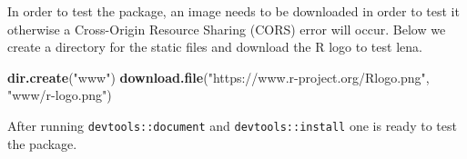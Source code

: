 \documentclass[
]{krantz}
\makeatletter
\newenvironment{Shaded}{\begin{snugshade}}{\end{snugshade}}
\newcommand{\CommentTok}[1]{\textcolor[rgb]{0.37,0.37,0.37}{\textit{#1}}}
\newcommand{\ControlFlowTok}[1]{\textcolor[rgb]{0.27,0.27,0.27}{\textbf{#1}}}
\newcommand{\DataTypeTok}[1]{\textcolor[rgb]{0.27,0.27,0.27}{#1}}
\newcommand{\KeywordTok}[1]{\textcolor[rgb]{0.27,0.27,0.27}{\textbf{#1}}}
\newcommand{\NormalTok}[1]{#1}
\newcommand{\OperatorTok}[1]{\textcolor[rgb]{0.43,0.43,0.43}{\textbf{#1}}}
\newcommand{\StringTok}[1]{\textcolor[rgb]{0.5,0.5,0.5}{#1}}
\newenvironment{kframe}{%
\medskip{}
\setlength{\fboxsep}{.8em}
 \def\at@end@of@kframe{}%
 \ifinner\ifhmode%
  \def\at@end@of@kframe{\end{minipage}}%
  \begin{minipage}{\columnwidth}%
 \fi\fi%
 \def\FrameCommand##1{\hskip\@totalleftmargin \hskip-\fboxsep
 \colorbox{shadecolor}{##1}\hskip-\fboxsep
     \hskip-\linewidth \hskip-\@totalleftmargin \hskip\columnwidth}%
 \MakeFramed {\advance\hsize-\width
   \@totalleftmargin\z@ \linewidth\hsize
   \@setminipage}}%
 {\par\unskip\endMakeFramed%
 \at@end@of@kframe}
\renewenvironment{Shaded}{\begin{kframe}}{\end{kframe}}
\makeatother
\begin{document}
In order to test the package, an image needs to be downloaded in order to test it otherwise a Cross-Origin Resource Sharing (CORS) error will occur. Below we create a directory for the static files and download the R logo to test lena.

\begin{Shaded}
\begin{Highlighting}[]
\KeywordTok{dir.create}\NormalTok{(}\StringTok{"www"}\NormalTok{)}
\KeywordTok{download.file}\NormalTok{(}\StringTok{"https://www.r{-}project.org/Rlogo.png"}\NormalTok{, }\StringTok{"www/r{-}logo.png"}\NormalTok{)}
\end{Highlighting}
\end{Shaded}

After running \texttt{devtools::document} and \texttt{devtools::install} one is ready to test the package.

\begin{Shaded}
\end{Shaded}
\end{document}
